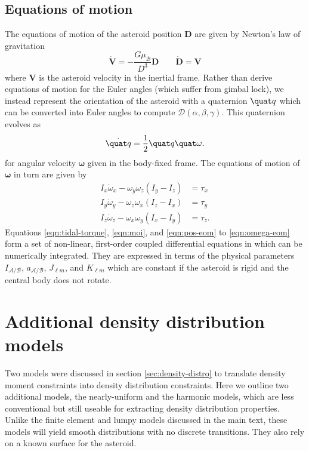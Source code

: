 \subsection{Equations of motion}
\label{sec:eom}


The equations of motion of the asteroid position $\bm D$ are given by Newton's law of gravitation
\begin{equation}
  \dot{\bm V} = -\frac{G \mu_\mathcal{B}}{D^3} \bm D \qquad \dot{\bm D} = \bm V
  \label{eqn:pos-eom}
\end{equation}
where $\bm V$ is the asteroid velocity in the inertial frame. Rather than derive equations of motion for the Euler angles (which suffer from gimbal lock), we instead represent the orientation of the asteroid with a quaternion $\quat q$ which can be converted into Euler angles to compute $\mathcal{D}(\alpha, \beta, \gamma)$. This quaternion evolves as 
\begin{equation}
  \dot{\quat q} = \frac{1}{2}\quat q\quat \omega.
  \label{eqn:quat-eom}
\end{equation}
for angular velocity $\bm \omega$ given in the body-fixed frame. The equations of motion of $\bm \omega$ in turn are given by
\begin{equation}
  \begin{split}
    I_x \dot \omega_x - \omega_y \omega_z (I_y - I_z) &= \tau_x\\
    I_y \dot \omega_y - \omega_z \omega_x (I_z - I_x) &= \tau_y\\
    I_z \dot \omega_z - \omega_x \omega_y (I_x - I_y) &= \tau_z.
  \end{split}
  \label{eqn:omega-eom}
\end{equation}
Equations \ref{eqn:tidal-torque}, \ref{eqn:moi}, and \ref{eqn:pos-eom} to \ref{eqn:omega-eom} form a set of non-linear, first-order coupled differential equations in which can be numerically integrated. They are expressed in terms of the physical parameters $I_\mathcal{A/B}$, $a_\mathcal{A/B}$, $J_{\ell m}$, and $K_{\ell m}$ which are constant if the asteroid is rigid and the central body does not rotate.





\section{Additional density distribution models}
\label{app:more-models}

Two models were discussed in section \ref{sec:density-distro} to translate density moment constraints into density distribution constraints. Here we outline two additional models, the nearly-uniform and the harmonic models, which are less conventional but still useable for extracting density distribution properties. Unlike the finite element and lumpy models discussed in the main text, these models will yield smooth distributions with no discrete transitions. They also rely on a known surface for the asteroid.

